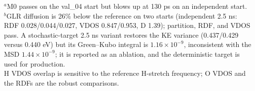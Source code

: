 \begin{table}[t]
{\begin{tabular}{@{}lcccccc@{}}
\bottomrule
\end{tabular}}
\begin{flushleft}
\footnotesize
$^a$M0 passes on the val\_04 start but blows up at 130 ps on an independent start.\\
$^b$GLR diffusion is 26\% below the reference on two starts (independent 2.5 ns: RDF
0.028/0.044/0.027, VDOS 0.847/0.953, D 1.39); partition, RDF, and VDOS pass. A stochastic-target
2.5 ns variant restores the KE variance (0.437/0.429 versus 0.440 eV) but its Green--Kubo integral
is \(1.16\times10^{-9}\), inconsistent with the MSD \(1.44\times10^{-9}\); it is reported as an
ablation, and the deterministic target is used for production.\\
H VDOS overlap is sensitive to the reference H-stretch frequency; O VDOS and the RDFs are the
robust comparisons.\\
\end{flushleft}
\end{table}
